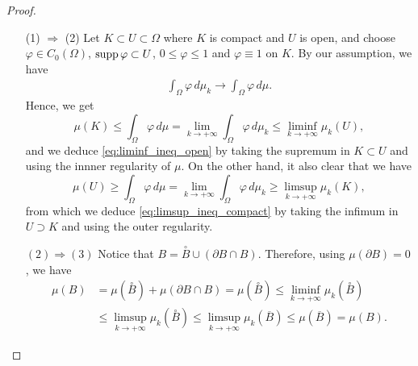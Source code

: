 \begin{proof}
\begin{enumerate}[(1)]
\item[(1) $\Rightarrow$ (2)] Let $K\subset U \subset \Omega$ where $K$ is compact and $U$ is open, and
choose $\varphi \in C_0(\Omega)$, $\operatorname{supp} \varphi \subset U$, $0 \leq \varphi
\leq 1$ and $\varphi \equiv 1$ on $K$. By our assumption, we have
\[
\begin{aligned}
\int_\Omega \varphi \, d\mu_k \to \int_\Omega \varphi \, d\mu.
\end{aligned}
\]
Hence, we get
\[
\mu(K) \leq \int_\Omega \varphi \, d\mu = \lim_{k\to +\infty} \int_\Omega \varphi
\, d\mu_k \leq \liminf_{k \to +\infty} \mu_k(U),
\]
and we deduce \eqref{eq:liminf_ineq_open} by taking the supremum in $K \subset U$ and using the innner regularity of $\mu$. On the other hand, it also clear that we have
\[
\mu(U) \geq \int_\Omega \varphi \, d\mu = \lim_{k \to +\infty} \int_\Omega \varphi \, d\mu_k \geq \limsup_{k \to +\infty} \mu_{k}(K),
\]
from which we deduce \eqref{eq:limsup_ineq_compact} by taking the infimum in $U \supset K$ and using the outer regularity.

\item[$(2) \Rightarrow (3)$]  Notice that $B = \overset{\circ}{B} \cup (\partial B \cap B)$. Therefore, using $\mu(\partial B) = 0$, we have
\[
\begin{aligned}
\mu(B) &= \mu(\overset{\circ}{B}) + \mu(\partial B \cap B) =
\mu(\overset{\circ}{B}) \leq \liminf_{k \to +\infty} \mu_k(\overset{\circ}{B}) 
\\ &\leq \limsup_{k\to +\infty} \mu_k(\overset{\circ}{B})
\leq \limsup_{k \to + \infty} \mu_k(\overline{B}) \leq \mu(\overline{B}) = \mu(B).
\end{aligned}
\]


\end{enumerate}
\end{proof}
